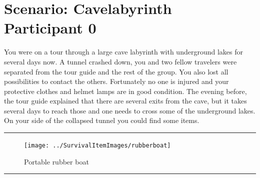 \documentclass{article}
\begin{document}
    \section*{Scenario: \textmd{Cavelabyrinth} \hfill Participant \textmd{0}}
    \Large You were on a tour through a large cave labyrinth with underground lakes for several days now. A tunnel crashed down, you and two fellow travelers were separated from the tour guide and the rest of the group. You also lost all possibilities to contact the others. Fortunately no one is injured and your protective clothes and helmet lamps are in good condition. The evening before, the tour guide explained that there are several exits from the cave, but it takes several days to reach those and one needs to cross some of the underground lakes. On your side of the collapsed tunnel you could find some items.\clearpage
        \par\noindent\rule{\textwidth}{0.4pt}
    \begin{figure}[H]
        \centering
        \begin{minipage}{0.25\textwidth}
            \centering
            \texttt{[image: ../SurvivalItemImages/rubberboat]}
        \end{minipage}\hfill
        \begin{minipage}{0.7\textwidth}
            \centering
            \Large Portable rubber boat
        \end{minipage}
    \end{figure}
    \vspace{-0.8em}
    \noindent\rule{\textwidth}{0.4pt}
            
\end{document}
